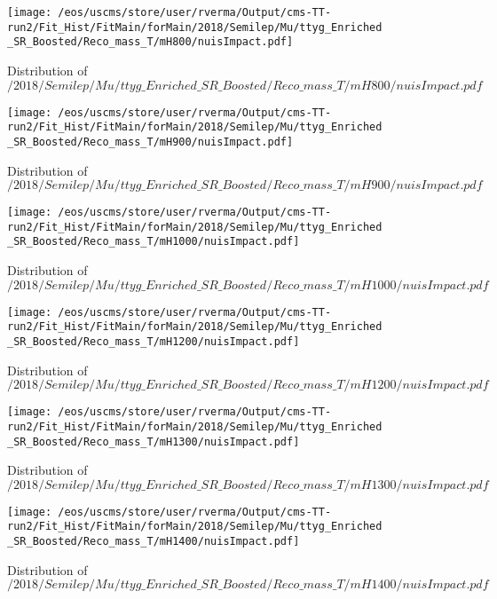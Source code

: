 \begin{figure}
\centering
\texttt{[image: /eos/uscms/store/user/rverma/Output/cms-TT-run2/Fit\_Hist/FitMain/forMain/2018/Semilep/Mu/ttyg\_Enriched\_SR\_Boosted/Reco\_mass\_T/mH800/nuisImpact.pdf]}
\caption{Distribution of $/2018/Semilep/Mu/ttyg\_Enriched\_SR\_Boosted/Reco\_mass\_T/mH800/nuisImpact.pdf$}
\end{figure}

\begin{figure}
\centering
\texttt{[image: /eos/uscms/store/user/rverma/Output/cms-TT-run2/Fit\_Hist/FitMain/forMain/2018/Semilep/Mu/ttyg\_Enriched\_SR\_Boosted/Reco\_mass\_T/mH900/nuisImpact.pdf]}
\caption{Distribution of $/2018/Semilep/Mu/ttyg\_Enriched\_SR\_Boosted/Reco\_mass\_T/mH900/nuisImpact.pdf$}
\end{figure}

\begin{figure}
\centering
\texttt{[image: /eos/uscms/store/user/rverma/Output/cms-TT-run2/Fit\_Hist/FitMain/forMain/2018/Semilep/Mu/ttyg\_Enriched\_SR\_Boosted/Reco\_mass\_T/mH1000/nuisImpact.pdf]}
\caption{Distribution of $/2018/Semilep/Mu/ttyg\_Enriched\_SR\_Boosted/Reco\_mass\_T/mH1000/nuisImpact.pdf$}
\end{figure}

\begin{figure}
\centering
\texttt{[image: /eos/uscms/store/user/rverma/Output/cms-TT-run2/Fit\_Hist/FitMain/forMain/2018/Semilep/Mu/ttyg\_Enriched\_SR\_Boosted/Reco\_mass\_T/mH1200/nuisImpact.pdf]}
\caption{Distribution of $/2018/Semilep/Mu/ttyg\_Enriched\_SR\_Boosted/Reco\_mass\_T/mH1200/nuisImpact.pdf$}
\end{figure}

\begin{figure}
\centering
\texttt{[image: /eos/uscms/store/user/rverma/Output/cms-TT-run2/Fit\_Hist/FitMain/forMain/2018/Semilep/Mu/ttyg\_Enriched\_SR\_Boosted/Reco\_mass\_T/mH1300/nuisImpact.pdf]}
\caption{Distribution of $/2018/Semilep/Mu/ttyg\_Enriched\_SR\_Boosted/Reco\_mass\_T/mH1300/nuisImpact.pdf$}
\end{figure}

\begin{figure}
\centering
\texttt{[image: /eos/uscms/store/user/rverma/Output/cms-TT-run2/Fit\_Hist/FitMain/forMain/2018/Semilep/Mu/ttyg\_Enriched\_SR\_Boosted/Reco\_mass\_T/mH1400/nuisImpact.pdf]}
\caption{Distribution of $/2018/Semilep/Mu/ttyg\_Enriched\_SR\_Boosted/Reco\_mass\_T/mH1400/nuisImpact.pdf$}
\end{figure}

